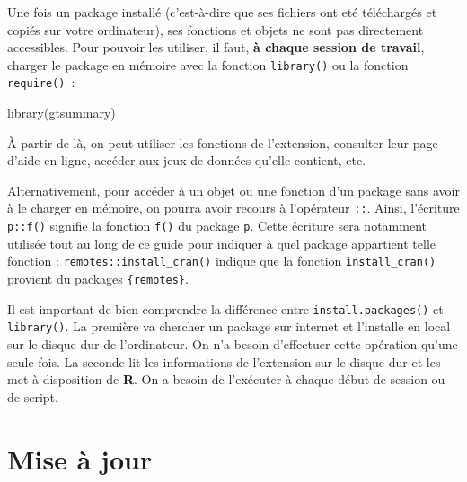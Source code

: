 \documentclass[
  letterpaper,
  DIV=11,
  numbers=noendperiod,
  oneside]{scrreprt}
\newenvironment{Shaded}{\begin{snugshade}}{\end{snugshade}}
\newcommand{\FunctionTok}[1]{\textcolor[rgb]{0.28,0.35,0.67}{#1}}
\newcommand{\NormalTok}[1]{\textcolor[rgb]{0.00,0.23,0.31}{#1}}
\begin{document}
Une fois un package installé (c'est-à-dire que ses fichiers ont eté
téléchargés et copiés sur votre ordinateur), ses fonctions et objets ne
sont pas directement accessibles. Pour pouvoir les utiliser, il faut,
\textbf{à chaque session de travail}, charger le package en mémoire avec
la fonction \texttt{library()} ou la fonction \texttt{require()}~:

\begin{Shaded}
\begin{Highlighting}[]
\FunctionTok{library}\NormalTok{(gtsummary)}
\end{Highlighting}
\end{Shaded}

À partir de là, on peut utiliser les fonctions de l'extension, consulter
leur page d'aide en ligne, accéder aux jeux de données qu'elle contient,
etc.

Alternativement, pour accéder à un objet ou une fonction d'un package
sans avoir à le charger en mémoire, on pourra avoir recours à
l'opérateur \texttt{::}. Ainsi, l'écriture \texttt{p::f()} signifie la
fonction \texttt{f()} du package \texttt{p}. Cette écriture sera
notamment utilisée tout au long de ce guide pour indiquer à quel package
appartient telle fonction : \texttt{remotes::install\_cran()} indique
que la fonction \texttt{install\_cran()} provient du packages
\texttt{\{remotes\}}.

\begin{tcolorbox}[enhanced jigsaw, colbacktitle=quarto-callout-important-color!10!white, opacityback=0, toprule=.15mm, colback=white, coltitle=black, bottomtitle=1mm, toptitle=1mm, titlerule=0mm, rightrule=.15mm, title=\textcolor{quarto-callout-important-color}{\faExclamation}\hspace{0.5em}{Important}, breakable, bottomrule=.15mm, opacitybacktitle=0.6, arc=.35mm, left=2mm, leftrule=.75mm, colframe=quarto-callout-important-color-frame]

Il est important de bien comprendre la différence entre
\texttt{install.packages()} et \texttt{library()}. La première va
chercher un package sur internet et l'installe en local sur le disque
dur de l'ordinateur. On n'a besoin d'effectuer cette opération qu'une
seule fois. La seconde lit les informations de l'extension sur le disque
dur et les met à disposition de \textbf{R}. On a besoin de l'exécuter à
chaque début de session ou de script.

\end{tcolorbox}

\hypertarget{mise-uxe0-jour}{%
\section{Mise à jour}\label{mise-uxe0-jour}}
\end{document}
